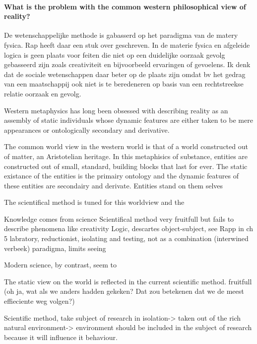 \paragraph{What is the problem with the common western philosophical view of reality?}
De wetenschappelijke methode is gabasserd op het paradigma van de matery fysica.
Rap heeft daar een stuk over geschreven.
In de materie fysica en afgeleide logica is geen plaats voor feiten die niet op een duidelijke oorzaak gevolg gebasseerd zijn zoals creativiteit en bijvoorbeeld ervaringen of gevoelens.
Ik denk dat de sociale wetenschappen daar beter op de plaats zijn omdat bv het gedrag van een maatschappij ook niet is te beredeneren op basis van een rechtstreekse relatie oorzaak en gevolg.







Western metaphysics has long been obsessed with describing reality as an assembly of static individuals whose dynamic features are either taken to be mere appearances or ontologically secondary and derivative. 

The common world view in the western world is that of a world constructed out of matter, an Aristotelian heritage. In this metaphisics of substance, entities are constructed out of small, standard, building blocks that last for ever. 
The static existance of the entities is the primairy ontology and the dynamic features of these entities are secondairy and derivate.
Entities stand on them selves

The scientifical method is tuned for this worldview and the 

Knowledge comes from science
Scientifical method very fruitfull but fails to describe phenomena like creativity
Logic, descartes object-subject, see Rapp in ch 5
labratory, reductionist, isolating and testing, not as a combination (interwined verbeek)
paradigma, limits seeing

Modern science, by contrast, seem to \cite[chapter 5]{rapp1990whitehad}


The static view on the world is reflected in the current scientific method.
fruitfull (oh ja, wat als we anders hadden gekeken? Dat zou betekenen dat we de meest effieciente weg volgen?)

Scientific method, take subject of research in isolation-> taken out of the rich natural environment-> environment should be included in the subject of research because it will influence it behaviour.

